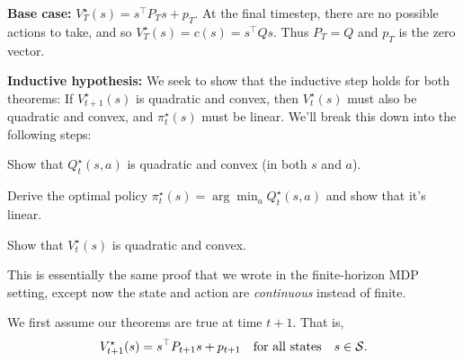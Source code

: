 \documentclass[../main/main]{subfiles}
\begin{document}
\textbf{Base case:} $V^\star_T(s) = s^\top P_T s + p_T.$ At the final timestep, there are no possible actions to take, and so $V^\star_T(s) = c(s) = s^\top Q s.$ Thus $P_T = Q$ and $p_T$ is the zero vector.

\textbf{Inductive hypothesis:} We seek to show that the inductive step holds for both theorems: If $V^\star_{t+1}(s)$ is quadratic and convex, then $V^\star_t(s)$ must also be quadratic and convex, and $\pi^\star_t(s)$ must be linear. We'll break this down into the following steps:
\begin{steps}
    \item Show that $Q^\star_t(s, a)$ is quadratic and convex (in both $s$ and $a$).
    \item Derive the optimal policy $\pi^\star_t(s) = \arg \min_a Q^\star_t(s, a)$ and show that it's linear.
    \item Show that $V^\star_t(s)$ is quadratic and convex.
\end{steps}
This is essentially the same proof that we wrote in the finite-horizon MDP setting,
except now the state and action are \emph{continuous} instead of finite.

We first assume our theorems are true at time $t+1.$ That is,
\[ V^\star_{t+1}(s) = s^\top P_{t+1} s + p_{t+1} \quad \text{for all states} \quad s \in \mathcal{S}. \]
\end{document}
